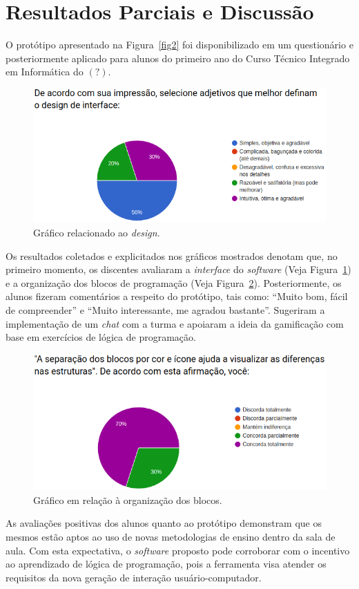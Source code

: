 \documentclass[12pt]{article}
\begin{document}
\section{Resultados Parciais e Discussão}
O protótipo apresentado na Figura~\ref{fig2} foi disponibilizado em um questionário e posteriormente aplicado para alunos do primeiro ano do Curso Técnico Integrado em Informática do $(?)$.
	\begin{figure}[!htbp]
		\centering
		\includegraphics[scale=0.4]{g1.png}
		\caption{Gráfico relacionado ao \textit{design}.}
		\label{fig3}
	\end{figure}
\par Os resultados coletados e explicitados nos gráficos mostrados denotam que, no primeiro momento, os discentes avaliaram a \textit{interface} do \textit{software} (Veja Figura~\ref{fig3}) e a organização dos blocos de programação (Veja Figura~\ref{fig4}). Posteriormente, os alunos fizeram comentários a respeito do protótipo, tais como: ``Muito bom, fácil de compreender'' e ``Muito interessante, me agradou bastante''. Sugeriram a implementação de um \textit{chat} com a turma e apoiaram a ideia da gamificação com base em exercícios de lógica de programação.
	\begin{figure}[!htbp]
		\centering
		\includegraphics[scale=0.4]{g2.png}
		\caption{Gráfico em relação à organização dos blocos.}
		\label{fig4}
	\end{figure} 
\par As avaliações positivas dos alunos quanto ao protótipo demonstram que os mesmos estão aptos ao uso de novas metodologias de ensino dentro da sala de aula. Com esta expectativa, o \textit{software} proposto pode corroborar com o incentivo ao aprendizado de lógica de programação, pois a ferramenta visa atender os requisitos da nova geração de interação usuário-computador. 	
\end{document}
